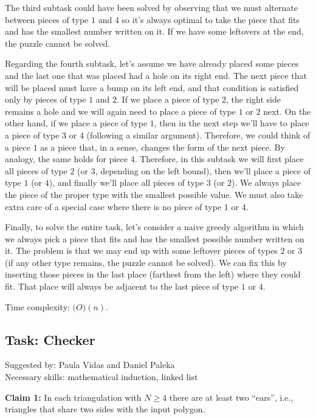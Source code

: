\documentclass[a4paper]{article}
\begin{document}
The third subtask could have been solved by observing that we must alternate
between pieces of type $1$ and $4$ so it's always optimal to take the piece that
fits and has the smallest number written on it. If we have some leftovers at the
end, the puzzle cannot be solved.

Regarding the fourth subtask, let's assume we have already placed some pieces
and the last one that was placed had a hole on its right end. The next piece
that will be placed must have a bump on its left end, and that condition is
satisfied only by pieces of type $1$ and $2$. If we place a piece of type $2$,
the right side remains a hole and we will again need to place a piece of type
$1$ or $2$ next. On the other hand, if we place a piece of type $1$, then in
the next step we'll have to place a piece of type $3$ or $4$ (following a
similar argument). Therefore, we could think of a piece $1$ as a piece that,
in a sense, changes the form of the next piece. By analogy, the same holds for
piece $4$. Therefore, in this subtask we will first place all pieces of type
$2$ (or $3$, depending on the left bound), then we'll place a piece of type $1$
(or $4$), and finally we'll place all pieces of type $3$ (or $2$). We always
place the piece of the proper type with the smallest possible value. We must
also take extra care of a special case where there is no piece of type $1$ or
$4$.

Finally, to solve the entire task, let's consider a naive greedy algorithm in
which we always pick a piece that fits and has the smallest possible number
written on it. The problem is that we may end up with some leftover pieces
of types $2$ or $3$ (if any other type remains, the puzzle cannot be solved).
We can fix this by inserting those pieces in the last place (farthest from
the left) where they could fit. That place will always be adjacent to the last
piece of type $1$ or $4$.

Time complexity: $\mathcal(O)(n)$.

\subsection*{Task: Checker}
\textsf{Suggested by: Paula Vidas and Daniel Paleka}\\
\textsf{Necessary skills: mathematical induction, linked list}

\textbf{Claim 1: } \; In each triangulation with $N \ge 4$ there are at least
two ``ears'', i.e., triangles that share two sides with the input polygon.
\end{document}
